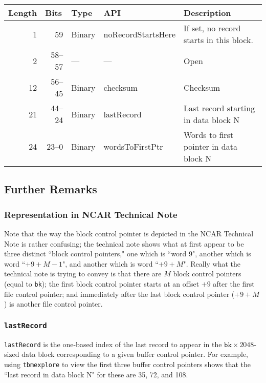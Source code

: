 \documentclass{report}
\newcommand{\controlworddesc}[1]{
\begin{center}
\begin{tabular}[t]{rrlTp{8.0cm}}
Length & \multicolumn{1}{l}{Bits} & Type & API & Description \\
\midrule
#1
\end{tabular}
\end{center}
}
\begin{document}
\controlworddesc{
 1 & 59     & Binary & noRecordStartsHere & If set, no record starts in this block. \\
 2 & 58--57 & ---    & \textrm{---}       & Open \\
12 & 56--45 & Binary & checksum           & Checksum\footnotemark \\
21 & 44--24 & Binary & lastRecord         & Last record starting in data block N \\
24 & 23--0  & Binary & wordsToFirstPtr    & Words to first pointer in data block N \\
}

\subsection{Further Remarks}

\subsubsection{Representation in NCAR Technical Note}

Note that the way the block control pointer is depicted in the NCAR Technical Note is rather confusing; the technical note shows what at first appear to be three distinct ``block control pointers," one which is ``word 9", another which is word ``\(+9+M-1\)", and another which is word ``\(+9+M\)". Really what the technical note is trying to convey is that there are \(M\) block control pointers (equal to \texttt{bk}); the first block control pointer starts at an offset \(+9\) after the first file control pointer; and immediately after the last block control pointer (\(+9+M\)) is another file control pointer.

\subsubsection{\texttt{lastRecord}}

\texttt{lastRecord} is the one-based index of the last record to appear in the \(\mathtt{bk} \times 2048\)-sized data block corresponding to a given buffer control pointer. For example, using \texttt{tbmexplore} to view the first three buffer control pointers shows that the ``last record in data block N" for these are 35, 72, and 108.
\end{document}
